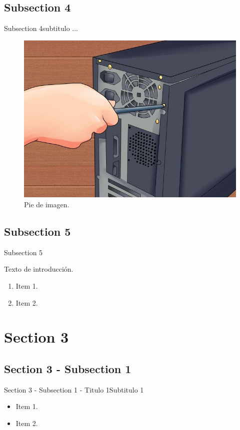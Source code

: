 \documentclass{beamer}
\begin{document}
\subsection{Subsection 4}
\begin{frame}{Subsection 4}{subtitulo ...}
\begin{figure}[H]
    \includegraphics[scale=0.3]{figura4.png}
    \caption{Pie de imagen.}
\end{figure}
\end{frame}


\subsection{Subsection 5}
\begin{frame}{Subsection 5}

Texto de introducción.

\pause
\begin{enumerate}
    \item Item 1.
    \item Item 2.
\end{enumerate}
\end{frame}


\section{Section 3}

\subsection{Section 3 - Subsection 1}
\begin{frame}{Section 3 - Subsection 1 - Titulo 1}{Subtitulo 1}
    \begin{itemize}
        \item Item 1.
        \item Item 2.
    \end{itemize}
\end{frame}
\end{document}
